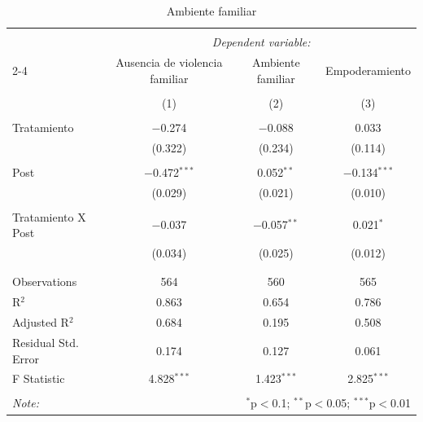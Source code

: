 
\begin{table}[H] \centering 
  \caption{Ambiente familiar} 
  \label{reg_ambiente} 
\tiny 
\begin{tabular}{@{\extracolsep{-7pt}}lccc} 
\\[-1.8ex]\hline 
\hline \\[-1.8ex] 
 & \multicolumn{3}{c}{\textit{Dependent variable:}} \\ 
\cline{2-4} 
 & Ausencia de violencia familiar & Ambiente familiar & Empoderamiento \\ 
\\[-1.8ex] & (1) & (2) & (3)\\ 
\hline \\[-1.8ex] 
 Tratamiento & $-$0.274 & $-$0.088 & 0.033 \\ 
  & (0.322) & (0.234) & (0.114) \\ 
  & & & \\ 
 Post & $-$0.472$^{***}$ & 0.052$^{**}$ & $-$0.134$^{***}$ \\ 
  & (0.029) & (0.021) & (0.010) \\ 
  & & & \\ 
 Tratamiento X Post & $-$0.037 & $-$0.057$^{**}$ & 0.021$^{*}$ \\ 
  & (0.034) & (0.025) & (0.012) \\ 
  & & & \\ 
\hline \\[-1.8ex] 
Observations & 564 & 560 & 565 \\ 
R$^{2}$ & 0.863 & 0.654 & 0.786 \\ 
Adjusted R$^{2}$ & 0.684 & 0.195 & 0.508 \\ 
Residual Std. Error & 0.174 & 0.127 & 0.061 \\ 
F Statistic & 4.828$^{***}$ & 1.423$^{***}$ & 2.825$^{***}$ \\ 
\hline 
\hline \\[-1.8ex] 
\textit{Note:}  & \multicolumn{3}{r}{$^{*}$p$<$0.1; $^{**}$p$<$0.05; $^{***}$p$<$0.01} \\ 
\end{tabular} 
\end{table} 

